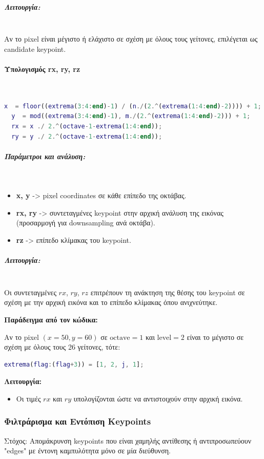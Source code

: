 \documentclass[12pt]{article}
\begin{document}
  \subparagraph{Λειτουργία:}  
  \mbox{}\\
  Αν το pixel είναι μέγιστο ή ελάχιστο σε σχέση με όλους τους γείτονες, επιλέγεται ως candidate keypoint.
  

\paragraph{Υπολογισμός rx, ry, rz}
\mbox{}\\
\begin{lstlisting}[language=Matlab]
  x  = floor((extrema(3:4:end)-1) / (n./(2.^(extrema(1:4:end)-2)))) + 1;
  y  = mod((extrema(3:4:end)-1), m./(2.^(extrema(1:4:end)-2))) + 1;
  rx = x ./ 2.^(octave-1-extrema(1:4:end));
  ry = y ./ 2.^(octave-1-extrema(1:4:end));
  \end{lstlisting}
  
\subparagraph{Παράμετροι και ανάλυση:}
\mbox{}\\
  \begin{itemize}
      \item \textbf{x, y} -> pixel coordinates σε κάθε επίπεδο της οκτάβας.
      \item \textbf{rx, ry} -> συντεταγμένες keypoint στην αρχική ανάλυση της εικόνας (προσαρμογή για downsampling ανά οκτάβα).
      \item \textbf{rz} -> επίπεδο κλίμακας του keypoint.
  \end{itemize}
  
\subparagraph{Λειτουργία:}  
\mbox{}\\
Οι συντεταγμένες $rx$, $ry$, $rz$ επιτρέπουν τη ανάκτηση της θέσης του keypoint σε σχέση με την αρχική εικόνα και το επίπεδο κλίμακας όπου ανιχνεύτηκε.
  
\textbf{Παράδειγμα από τον κώδικα:}

Αν το pixel $(x=50, y=60)$ σε $\text{octave}=1$ και $\text{level}=2$ είναι το μέγιστο σε σχέση με όλους τους 26 γείτονες, τότε:

\begin{lstlisting}[language=Matlab]
extrema(flag:(flag+3)) = [1, 2, j, 1];
\end{lstlisting}

\textbf{Λειτουργία:}
\begin{itemize}
    \item Οι τιμές $rx$ και $ry$ υπολογίζονται ώστε να αντιστοιχούν στην αρχική εικόνα.
\end{itemize}


\subsubsection{Φιλτράρισμα και Εντόπιση Keypoints}
Στόχος: Απομάκρυνση keypoints που είναι χαμηλής αντίθεσης ή αντιπροσωπεύουν "edges" με έντονη καμπυλότητα μόνο σε μία διεύθυνση.
\end{document}
